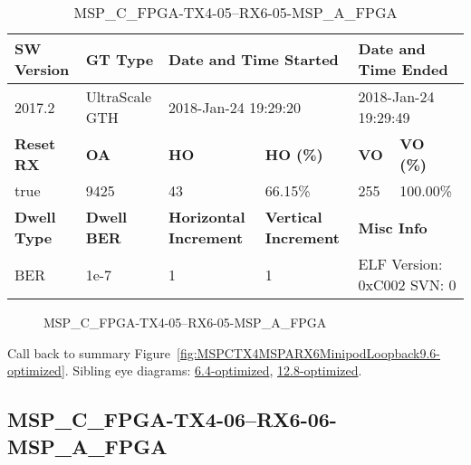 \begin{table}[h]
\centering
\caption{MSP\_C\_FPGA-TX4-05--RX6-05-MSP\_A\_FPGA}
\label{tab:MSPCFPGATX405RX605MSPAFPGA9.6-optimized}
\begin{tabular}{@{}|l|l|l|l|l|l|@{}}
\toprule
\textbf{SW Version}                & \textbf{GT Type}   & \multicolumn{2}{l|}{\textbf{Date and Time Started}}            & \multicolumn{2}{l|}{\textbf{Date and Time Ended}}        \\ \midrule
2017.2                       & UltraScale GTH          & \multicolumn{2}{l|}{2018-Jan-24 19:29:20}                   & \multicolumn{2}{l|}{2018-Jan-24 19:29:49}               \\ \midrule
\textbf{Reset RX}                  & \textbf{OA} & \textbf{HO}   & \textbf{HO (\%)} & \textbf{VO} & \textbf{VO (\%)} \\ \midrule
true & 9425        & 43          & 66.15\%        & 255        & 100.00\%       \\ \midrule
\textbf{Dwell Type}                & \textbf{Dwell BER} & \textbf{Horizontal Increment} & \textbf{Vertical Increment}    & \multicolumn{2}{l|}{\textbf{Misc Info}}                  \\ \midrule
BER                            & 1e-7        & 1        & 1           & \multicolumn{2}{l|}{ELF Version: 0xC002 SVN: 0}                         \\ \bottomrule
\end{tabular}
\end{table}

\begin{figure}[h]
\caption{MSP\_C\_FPGA-TX4-05--RX6-05-MSP\_A\_FPGA} \label{fig:MSPCFPGATX405RX605MSPAFPGA9.6-optimized}
\end{figure}

Call back to summary Figure~\ref{fig:MSPCTX4MSPARX6MinipodLoopback9.6-optimized}.
Sibling eye diagrams: \hyperref[sec:MSPCFPGATX405RX605MSPAFPGA6.4-optimized]{6.4-optimized}, \hyperref[sec:MSPCFPGATX405RX605MSPAFPGA12.8-optimized]{12.8-optimized}.

\clearpage
\newpage


\subsection{MSP\_C\_FPGA-TX4-06--RX6-06-MSP\_A\_FPGA}\label{sec:MSPCFPGATX406RX606MSPAFPGA9.6-optimized}

